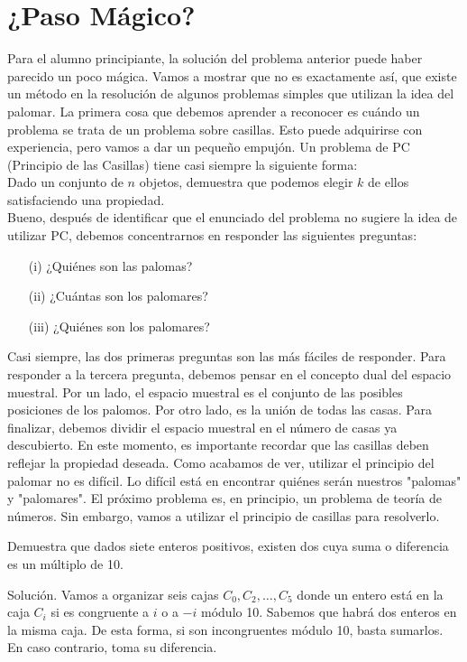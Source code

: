 \documentclass[11pt]{scrartcl}
\begin{document}
\section{¿Paso Mágico?}
Para el alumno principiante, la solución del problema anterior puede haber parecido un poco mágica. Vamos a mostrar que no es exactamente así, que existe un método en la resolución de algunos problemas simples que utilizan la idea del palomar. La primera cosa que debemos aprender a reconocer es cuándo un problema se trata de un problema sobre casillas. Esto puede adquirirse con experiencia, pero vamos a dar un pequeño empujón. Un problema de PC (Principio de las Casillas) tiene casi siempre la siguiente forma:\\

Dado un conjunto de \(n\) objetos, demuestra que podemos elegir \(k\) de ellos satisfaciendo una propiedad.\\

Bueno, después de identificar que el enunciado del problema no sugiere la idea de utilizar PC, debemos concentrarnos en responder las siguientes preguntas:
\begin{itemize}
\item[(i)] ¿Quiénes son las palomas?
\item[(ii)] ¿Cuántas son los palomares?
\item[(iii)] ¿Quiénes son los palomares?
\end{itemize}
Casi siempre, las dos primeras preguntas son las más fáciles de responder. Para responder a la tercera pregunta, debemos pensar en el concepto dual del espacio muestral. Por un lado, el espacio muestral es el conjunto de las posibles posiciones de los palomos. Por otro lado, es la unión de todas las casas.
Para finalizar, debemos dividir el espacio muestral en el número de casas ya descubierto. En este momento, es importante recordar que las casillas deben reflejar la propiedad deseada. Como acabamos de ver, utilizar el principio del palomar no es difícil. Lo difícil está en encontrar quiénes serán nuestros "palomas" y "palomares". El próximo problema es, en principio, un problema de teoría de números. Sin embargo, vamos a utilizar el principio de casillas para resolverlo.

\begin{example}
    Demuestra que dados siete enteros positivos, existen dos cuya suma o diferencia es un múltiplo de 10.
\end{example}
Solución. Vamos a organizar seis cajas \(C_0, C_2, \ldots, C_5\) donde un entero está en la caja \(C_i\) si es congruente a \(i\) o a \(-i\) módulo 10. Sabemos que habrá dos enteros en la misma caja. De esta forma, si son incongruentes módulo 10, basta sumarlos. En caso contrario, toma su diferencia.
\end{document}
